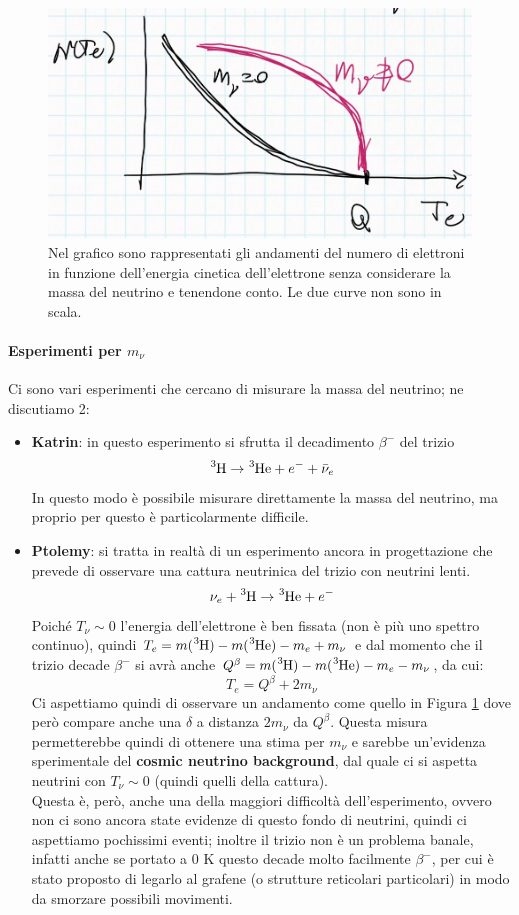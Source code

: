 \begin{figure}[h]
    \centering
    \includegraphics[scale=0.3]{Immagini/0304_neutrini.png}
    \caption{Nel grafico sono rappresentati gli andamenti del numero di elettroni in funzione dell'energia cinetica dell'elettrone senza considerare la massa del neutrino e tenendone conto. Le due curve non sono in scala.}
    \label{0304_nu}
\end{figure}

\paragraph{Esperimenti per $m_\nu$} Ci sono vari esperimenti che cercano di misurare la massa del neutrino; ne discutiamo 2:
\begin{itemize}
    \item \textbf{Katrin}: in questo esperimento si sfrutta il decadimento $\beta^-$ del trizio
    $$\ce{^3H}\to\ce{^3He} + e^- +\bar{\nu}_e$$
    In questo modo è possibile misurare direttamente la massa del neutrino, ma proprio per questo è particolarmente difficile.
    \item \textbf{Ptolemy}: si tratta in realtà di un esperimento ancora in progettazione che prevede di osservare una cattura neutrinica del trizio con neutrini lenti.
    $$\nu_e + \ce{^3H}\to\ce{^3He} + e^-$$
    Poiché $T_\nu\sim 0$ l'energia dell'elettrone è ben fissata (non è più uno spettro continuo), quindi $T_e = m(\ce{^3H}) - m(\ce{^3He}) -m_e +m_\nu $ e dal momento che il trizio decade $\beta^-$ si avrà anche $Q^\beta = m(\ce{^3H})-m(\ce{^3He})-m_e-m_\nu$, da cui:
    $$T_e = Q^\beta + 2m_\nu$$
    Ci aspettiamo quindi di osservare un andamento come quello in Figura \ref{0304_nu} dove però compare anche una $\delta$ a distanza $2m_\nu$ da $Q^\beta$. Questa misura permetterebbe quindi di ottenere una stima per $m_\nu$ e sarebbe un'evidenza sperimentale del \textbf{cosmic neutrino background}, dal quale ci si aspetta neutrini con $T_\nu\sim0 $ (quindi quelli della cattura).\\
    Questa è, però, anche una della maggiori difficoltà dell'esperimento, ovvero non ci sono ancora state evidenze di questo fondo di neutrini, quindi ci aspettiamo pochissimi eventi; inoltre  il trizio non è un problema banale, infatti anche se portato a 0 K questo decade molto facilmente $\beta^-$, per cui è stato proposto di legarlo al grafene (o strutture reticolari particolari) in modo da smorzare possibili movimenti.
\end{itemize}

